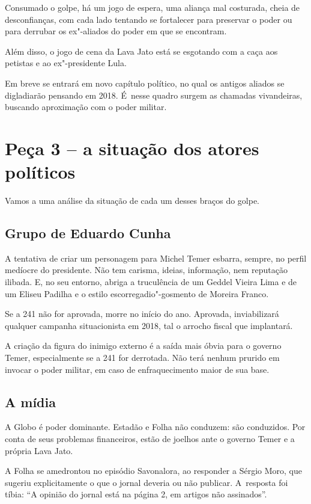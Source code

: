 Consumado o golpe, há um jogo de espera, uma aliança mal costurada,
cheia de desconfianças, com cada lado tentando se fortalecer para
preservar o poder ou para derrubar os ex"-aliados do poder em que se
encontram.

Além disso, o jogo de cena da Lava Jato está se esgotando com a caça aos
petistas e ao ex"-presidente Lula.

Em breve se entrará em novo capítulo político, no qual os antigos
aliados se digladiarão pensando em 2018. É~nesse quadro surgem as
chamadas vivandeiras, buscando aproximação com o poder militar.

\section{Peça 3 -- a situação dos atores políticos}

Vamos a uma análise da situação de cada um desses braços do golpe.

\subsection{Grupo de Eduardo Cunha}

A tentativa de criar um personagem para Michel Temer esbarra, sempre, no
perfil medíocre do presidente. Não tem carisma, ideias, informação, nem
reputação ilibada. E, no seu entorno, abriga a truculência de um Geddel
Vieira Lima e de um Eliseu Padilha e o estilo escorregadio"-gosmento de
Moreira Franco.

Se a  241 não for aprovada, morre no início do ano. Aprovada,
inviabilizará qualquer campanha situacionista em 2018, tal o arrocho
fiscal que implantará.

A criação da figura do inimigo externo é a saída mais óbvia para o
governo Temer, especialmente se a  241 for derrotada. Não terá nenhum
prurido em invocar o poder militar, em caso de enfraquecimento maior de
sua base.

\subsection{A mídia}

A Globo é poder dominante. Estadão e Folha não conduzem: são conduzidos.
Por conta de seus problemas financeiros, estão de joelhos ante o governo
Temer e a própria Lava Jato.

A Folha se amedrontou no episódio Savonalora, ao responder a Sérgio
Moro, que sugeriu explicitamente o que o jornal deveria ou não publicar.
A~resposta foi tíbia: ``A opinião do jornal está na página 2, em artigos
não assinados''.

